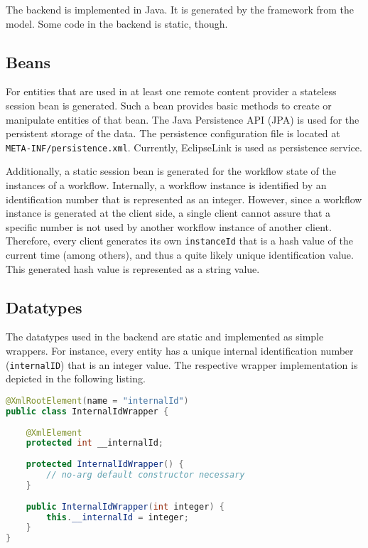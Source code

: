 
\lstset{language=Simple}

The \MD backend is implemented in Java. It is generated by the \MD framework from the \MD model. Some code in the backend is static, though. 

\subsection{Beans}
\label{subsec:beans}
For entities that are used in at least one remote content provider a stateless session bean is generated. Such a bean provides basic methods to create or manipulate entities of that bean. The Java Persistence API (JPA) is used for the persistent storage of the data. The persistence configuration file is located at \lstinline|META-INF/persistence.xml|. Currently, EclipseLink is used as persistence service.

Additionally, a static session bean is generated for the workflow state of the instances of a workflow. Internally, a workflow instance is identified by an identification number that is represented as an integer. However, since a workflow instance is generated at the client side, a single client cannot assure that a specific number is not used by another workflow instance of another client. Therefore, every client generates its own \lstinline|instanceId| that is a hash value of the current time (among others), and thus a quite likely unique identification value. This generated hash value is represented as a string value.

\subsection{Datatypes}
The datatypes used in the backend are static and implemented as simple wrappers. For instance, every entity has a unique internal identification number (\lstinline|internalID|) that is an integer value. The respective wrapper implementation is depicted in the following listing. 

\begin{lstlisting}[language=Java, label=lst:intIdWrapper, caption=An integer wrapper for the internal identification number]
@XmlRootElement(name = "internalId")
public class InternalIdWrapper {
	
	@XmlElement
	protected int __internalId;
	
	protected InternalIdWrapper() {
		// no-arg default constructor necessary
	}
	
	public InternalIdWrapper(int integer) {
		this.__internalId = integer;
	}
}
\end{lstlisting}

